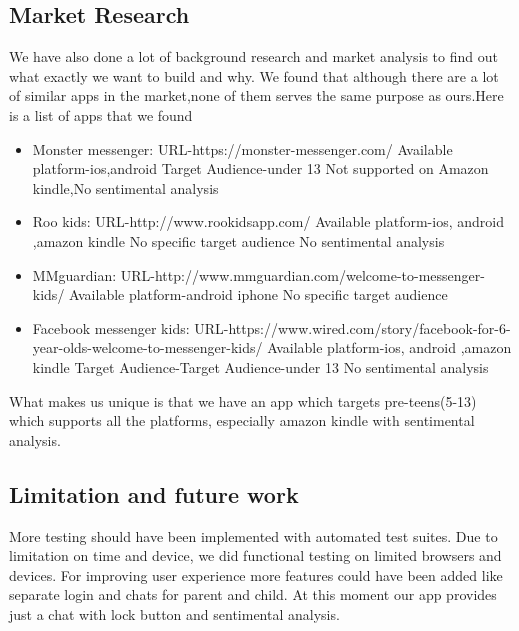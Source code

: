 \documentclass[a4paper,10pt]{article}
\begin{document}
\subsection{Market Research}
We have also done a lot of background research and market analysis to find out what exactly we want to build and why. We found that although there are a lot of similar apps in the market,none of them serves the same purpose as ours.Here is a list of apps that we found
\begin{itemize}
\item  Monster messenger:
\newline
URL-https://monster-messenger.com/
\newline
Available platform-ios,android
\newline
Target Audience-under 13
\newline
Not supported on Amazon kindle,No sentimental analysis
\item  Roo kids:
\newline
URL-http://www.rookidsapp.com/
\newline
Available platform-ios, android ,amazon kindle
\newline
No specific target audience
No sentimental analysis
\item  MMguardian:
\newline
URL-http://www.mmguardian.com/welcome-to-messenger-kids/
\newline
Available platform-android iphone
\newline
No specific target audience
\item  Facebook messenger kids:
\newline
URL-https://www.wired.com/story/facebook-for-6-year-olds-welcome-to-messenger-kids/
\newline
Available platform-ios, android ,amazon kindle
\newline
Target Audience-Target Audience-under 13
No sentimental analysis
\end{itemize}
What makes us unique is that we have an app which targets pre{-}teens(5-13) which  supports all the platforms, especially amazon kindle with sentimental analysis.
\subsection{Limitation and future work}
More testing should have been implemented with automated test suites.  Due to limitation on time and device, we did functional testing on limited browsers and devices.
\newline
For improving user experience more features could have been added like separate login and chats for parent and child. At this moment our app provides just a chat with lock button and sentimental analysis.
\end{document}
